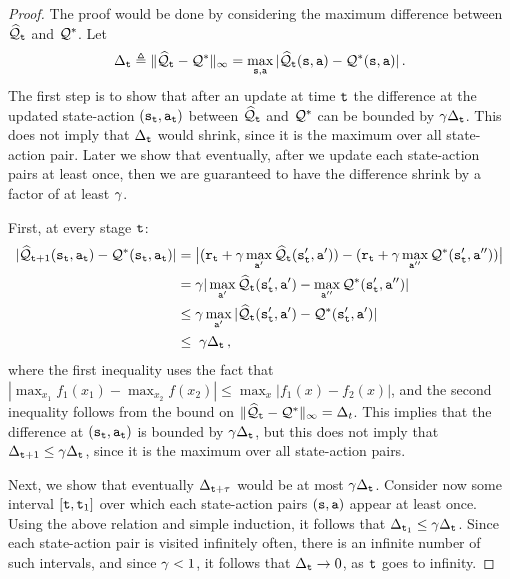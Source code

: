 \begin{proof}
The proof would be done by considering the maximum difference between $\widehat{\mathcal{Q}}_{\tt t}$ and $\mathcal{Q}^*$.
Let
\[
\Delta_{\tt t} \triangleq \|\widehat{\mathcal{Q}}_{\tt t}-\mathcal{Q}^*\|_\infty =
\max_{{\tt s},{\tt a}}
|\widehat{\mathcal{Q}}_{\tt t}({\tt s},{\tt a})-\mathcal{Q}^*({\tt s},{\tt a}) | \,.
\]
The first step is to show that after an update at time ${\tt t}$ the difference at the updated state-action $({\tt s}_{\tt t},{\tt a}_{\tt t})$ between $\widehat{\mathcal{Q}}_{\tt t}$ and $\mathcal{Q}^*$ can be bounded by $\gamma \Delta_{\tt t}$. This does not imply that $\Delta_{{\tt t}}$ would shrink, since it is the maximum over all state-action pair. Later we show that eventually, after we update each state-action pairs at least once, then we are guaranteed to have the difference shrink by a factor of at least $\gamma$. 

First, at every stage ${\tt t}$:
\begin{align*}
| \widehat{\mathcal{Q}}_{{\tt t}+1}({\tt s}_{\tt t},{\tt a}_{\tt t})-
\mathcal{Q}^*({\tt s}_{\tt t},{\tt a}_{\tt t})| &=
\big|({\tt r}_{\tt t}+\gamma\max_{{\tt a}'}
\widehat{\mathcal{Q}}_{\tt t}({\tt s}_{{\tt t}}',{\tt a}'))
- ({\tt r}_{\tt t}+\gamma\max_{{\tt a}''} \mathcal{Q}^*({\tt s}_{{\tt t}}',{\tt a}'') ) \big| \\
&= \gamma |\max_{{\tt a}'} \widehat{\mathcal{Q}}_{\tt t}({\tt s}_{{\tt t}}',{\tt a}') -\max_{{\tt a}''} \mathcal{Q}^*({\tt s}_{{\tt t}}',{\tt a}'') | \\
& \le \gamma \max_{{\tt a}'}
|\widehat{\mathcal{Q}}_{\tt t}({\tt s}_{{\tt t}}',{\tt a}') -
\mathcal{Q}^*({\tt s}_{{\tt t}}',{\tt a}') | \\
&\le\; \gamma \Delta_{\tt t}
\,,
\end{align*}
where the first inequality uses the fact that $|\max_{x_1} f_1(x_1)-\max_{x_2}f(x_2)|\leq \max_x|f_1(x)-f_2(x)|$, and the second inequality follows from the bound on $\|\widehat{\mathcal{Q}}_{\tt t}-\mathcal{Q}^*\|_\infty =\Delta_t $.
This implies that the difference at $({\tt s}_{\tt t},{\tt a}_{\tt t})$ is bounded by $\gamma\Delta_{\tt t}$, but this does not imply that $\Delta_{{\tt t}+1}\leq \gamma\Delta_{{\tt t}}$, since it is the maximum over all state-action pairs.

Next, we show that eventually $\Delta_{{\tt t}+\tau}$ would be at most $ \gamma\Delta_{{\tt t}}$.
Consider now some interval $[{\tt t},{\tt t}_1]$ over which each state-action pairs $({\tt s},{\tt a})$ appear at least once. Using the above relation and simple induction, it follows that $\Delta_{{\tt t}_1} \le \gamma \Delta_{{\tt t}}$.
%
Since each state-action pair is visited infinitely often, there is
an infinite number of such intervals, and since $\gamma<1$, it
follows that $\Delta_{\tt t} \to 0$, as ${\tt t}$ goes to infinity.
\end{proof}


